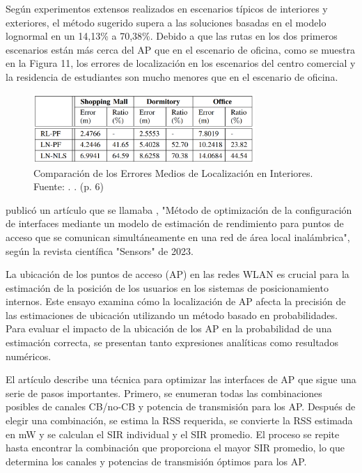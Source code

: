 Según experimentos extensos realizados en escenarios típicos de interiores y exteriores, el método sugerido supera a las soluciones basadas en el modelo lognormal en un 14,13\% a 70,38\%. Debido a que las rutas en los dos primeros escenarios están más cerca del AP que en el escenario de oficina, como se muestra en la Figura 11, los errores de localización en los escenarios del centro comercial y la residencia de estudiantes son mucho menores que en el escenario de oficina.

\begin{figure}[!ht]
	\begin{center}
		\includegraphics[width=0.75\textwidth]{2/figures/shen2018.png}
		\caption[Comparación de los Errores Medios de Localización en Interiores]{Comparación de los Errores Medios de Localización en Interiores.\\
			Fuente: \cite{pr_shen2018localaplognor}. . (p. 6)}
		\label{2:fig119}
	\end{center}
\end{figure}

\newpage
\cite{pr_akhter2023interfacesetup} publicó un artículo que se llamaba , "Método de optimización de la configuración de interfaces mediante un modelo de estimación de rendimiento para puntos de acceso que se comunican simultáneamente en una red de área local inalámbrica", según la revista científica "Sensors" de 2023.

La ubicación de los puntos de acceso (AP) en las redes WLAN es crucial para la estimación de la posición de los usuarios en los sistemas de posicionamiento internos. Este ensayo examina cómo la localización de AP afecta la precisión de las estimaciones de ubicación utilizando un método basado en probabilidades. Para evaluar el impacto de la ubicación de los AP en la probabilidad de una estimación correcta, se presentan tanto expresiones analíticas como resultados numéricos.

El artículo describe una técnica para optimizar las interfaces de AP que sigue una serie de pasos importantes. Primero, se enumeran todas las combinaciones posibles de canales CB/no-CB y potencia de transmisión para los AP. Después de elegir una combinación, se estima la RSS requerida, se convierte la RSS estimada en mW y se calculan el SIR individual y el SIR promedio. El proceso se repite hasta encontrar la combinación que proporciona el mayor SIR promedio, lo que determina los canales y potencias de transmisión óptimos para los AP.

